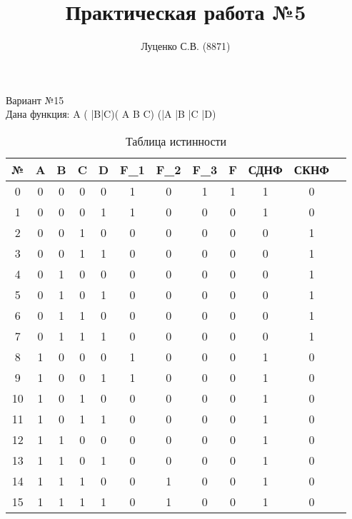 \documentclass[a4paper,11pt]{article}
\title{Практическая работа №5}
\author{Луценко С.В. (8871)}
\begin{document}
\maketitle
\begin{center}
\begin{flushleft}
Вариант №15 \\
Дана функция: A \vee ( \bar B\wedge  \bar C)\vee( A \wedge B \wedge C) \vee (\bar A \wedge \bar B \wedge \bar C \wedge \bar D)\\
\end{flushleft}
\begin{table}[h]
\centering
\begin{tabular}{|c|c|c|c|c|c|c|c|c|c|c|c|}
\hline
№ & A & B & C & D & F_1 & F_2 & F_3 & F & СДНФ & СКНФ  \\
\hline
0 & 0 & 0 & 0 & 0 & 1 & 0 & 1 & 1 & 1 & 0\\
1 & 0 & 0 & 0 & 1 & 1 & 0 & 0 & 0 & 1 & 0\\
2 & 0 & 0 & 1 & 0 & 0 & 0 & 0 & 0 & 0 & 1\\
3 & 0 & 0 & 1 & 1 & 0 & 0 & 0 & 0 & 0 & 1\\
4 & 0 & 1 & 0 & 0 & 0 & 0 & 0 & 0 & 0 & 1\\
5 & 0 & 1 & 0 & 1 & 0 & 0 & 0 & 0 & 0 & 1\\
6 & 0 & 1 & 1 & 0 & 0 & 0 & 0 & 0 & 0 & 1\\
7 & 0 & 1 & 1 & 1 & 0 & 0 & 0 & 0 & 0 & 1\\
8 & 1 & 0 & 0 & 0 & 1 & 0 & 0 & 0 & 1 & 0\\
9 & 1 & 0 & 0 & 1 & 1 & 0 & 0 & 0 & 1 & 0\\
10 & 1 & 0 & 1 & 0 & 0 & 0 & 0 & 0 & 1 & 0\\
11 & 1 & 0 & 1 & 1 & 0 & 0 & 0 & 0 & 1 & 0\\
12 & 1 & 1 & 0 & 0 & 0 & 0 & 0 & 0 & 1 & 0\\
13 & 1 & 1 & 0 & 1 & 0 & 0 & 0 & 0 & 1 & 0\\
14 & 1 & 1 & 1 & 0 & 0 & 1 & 0 & 0 & 1 & 0\\
15 & 1 & 1 & 1 & 1 & 0 & 1 & 0 & 0 & 1 & 0\\
\hline
\end{tabular}
\caption{Таблица истинности}
\end{table}
\end{center}\\
\end{document}

